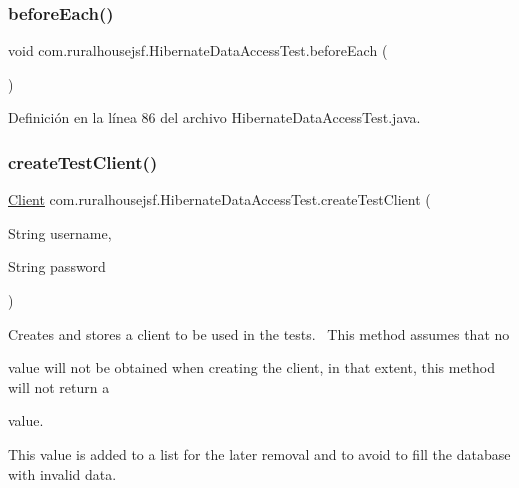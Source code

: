 \subsubsection{\texorpdfstring{beforeEach()}{beforeEach()}}
{\footnotesize\ttfamily void com.\+ruralhousejsf.\+Hibernate\+Data\+Access\+Test.\+before\+Each (\begin{DoxyParamCaption}{ }\end{DoxyParamCaption})\hspace{0.3cm}{\ttfamily [package]}}



Definición en la línea 86 del archivo Hibernate\+Data\+Access\+Test.\+java.

\mbox{\label{classcom_1_1ruralhousejsf_1_1_hibernate_data_access_test_a971c94d6c41317c2cc8de024153f0dc9}} 
\subsubsection{\texorpdfstring{createTestClient()}{createTestClient()}}
{\footnotesize\ttfamily \mbox{\hyperlink{classcom_1_1ruralhousejsf_1_1domain_1_1_client}{Client}} com.\+ruralhousejsf.\+Hibernate\+Data\+Access\+Test.\+create\+Test\+Client (\begin{DoxyParamCaption}\item[{String}]{username,  }\item[{String}]{password }\end{DoxyParamCaption})\hspace{0.3cm}{\ttfamily [private]}}

Creates and stores a client to be used in the tests.~\newline
 This method assumes that no
\begin{DoxyCode}{0}
\DoxyCodeLine{\textcolor{keyword}{null} }
\end{DoxyCode}
 value will not be obtained when creating the client, in that extent, this method will not return a 
\begin{DoxyCode}{0}
\DoxyCodeLine{\textcolor{keyword}{null} }
\end{DoxyCode}
 value. 

This value is added to a list for the later removal and to avoid to fill the database with invalid data.


